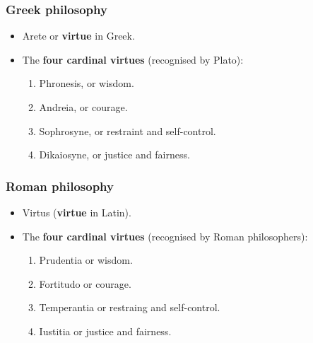 \documentclass[11pt]{article}
\begin{document}
\subsubsection{Greek philosophy}
\label{sec:org457d5b9}
\begin{itemize}
\item Arete or \textbf{virtue} in Greek.
\item The \textbf{four cardinal virtues} (recognised by Plato):
\begin{enumerate}
\item Phronesis, or wisdom.
\item Andreia, or courage.
\item Sophrosyne, or restraint and self-control.
\item Dikaiosyne, or justice and fairness.
\end{enumerate}
\end{itemize}
\subsubsection{Roman philosophy}
\label{sec:org29a2562}
\begin{itemize}
\item Virtus (\textbf{virtue} in Latin).
\item The \textbf{four cardinal virtues} (recognised by Roman philosophers):
\begin{enumerate}
\item Prudentia or wisdom.
\item Fortitudo or courage.
\item Temperantia or restraing and self-control.
\item Iustitia or justice and fairness.
\end{enumerate}
\end{itemize}
\end{document}
